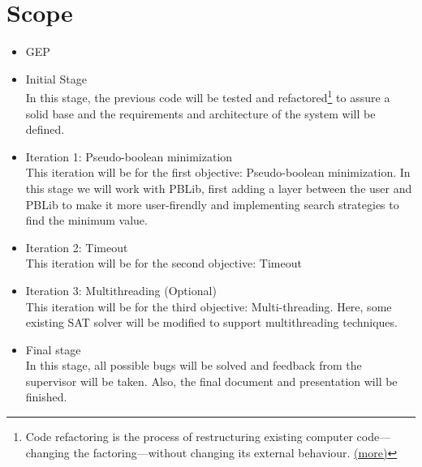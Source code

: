 
\chapter{Scope} %

\label{Chapter2} %

\begin{itemize}
	\item GEP
	\item Initial Stage\\
	In this stage, the previous code will be tested and refactored\footnote{Code refactoring is the process of restructuring existing computer code—changing the factoring—without changing its external behaviour. \href{https://en.wikipedia.org/wiki/Code_refactoring}{(more)}} to assure a solid base and the requirements and architecture of the system will be defined.
	\item Iteration 1: Pseudo-boolean minimization\\
	This iteration will be for the first objective: Pseudo-boolean minimization. In this stage we will work with PBLib, first adding a layer between the user and PBLib to make it more user-firendly and implementing search strategies to find the minimum value.
	\item Iteration 2: Timeout\\
	This iteration will be for the second objective: Timeout
	\item Iteration 3: Multithreading (Optional)\\
	This iteration will be for the third objective: Multi-threading. Here, some existing SAT solver will be modified to support multithreading techniques.
	\item Final stage\\
	In this stage, all possible bugs will be solved and feedback from the supervisor will be taken. Also, the final document and presentation will be finished. 
\end{itemize}
